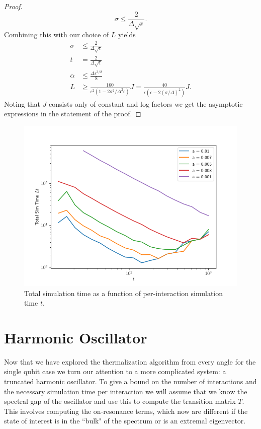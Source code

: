\documentclass{article}
\begin{document}
\begin{proof}
\begin{equation}
    \sigma \le \frac{2}{\Delta \sqrt{\epsilon}}.
\end{equation}
 Combining this with our choice of $L$ yields
 \begin{align}
     \sigma & \le \frac{2}{\Delta \sqrt{\epsilon}} \\
     t &= \frac{2}{\Delta \sqrt{\epsilon}} \\
     \alpha &\le \frac{\Delta \epsilon^{3/2}}{8} \\
     L &\ge \frac{160}{\epsilon^2( 1 - 2 \sigma^2 / \Delta^2 \epsilon)} J = \frac{40}{\epsilon(\epsilon - 2 (\sigma / \Delta)^2)} J.
\end{align}
Noting that $J$ consists only of constant and log factors we get the asymptotic expressions in the statement of the proof.
\end{proof}

\begin{figure}
    \centering
    \includegraphics[width=0.75\linewidth]{numerics/data/total_time_vs_time.png}
    \caption{Total simulation time as a function of per-interaction simulation time $t$.}
    \label{fig:total_time_vs_time}
\end{figure}

\section{Harmonic Oscillator}
Now that we have explored the thermalization algorithm from every angle for the single qubit case we turn our attention to a more complicated system: a truncated harmonic oscillator. To give a bound on the number of interactions and the necessary simulation time per interaction we will assume that we know the spectral gap of the oscillator and use this to compute the transition matrix $T$. This involves computing the on-resonance terms, which now are different if the state of interest is in the ``bulk" of the spectrum or is an extremal eigenvector. 
\end{document}
